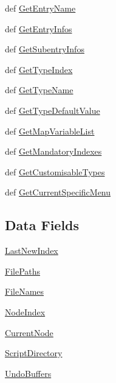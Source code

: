 \begin{CompactItemize}
def \hyperlink{classnodemanager_1_1NodeManager_4da3a475cb7e66bf86f42aa8e9915673}{Get\-Entry\-Name}
\item 
def \hyperlink{classnodemanager_1_1NodeManager_eb864b0df23c119a93ec91836f7dc131}{Get\-Entry\-Infos}
\item 
def \hyperlink{classnodemanager_1_1NodeManager_b305e31c72f62266cfc5e15b056a0e90}{Get\-Subentry\-Infos}
\item 
def \hyperlink{classnodemanager_1_1NodeManager_a6660f49630ad17289a6f8c13569aef8}{Get\-Type\-Index}
\item 
def \hyperlink{classnodemanager_1_1NodeManager_02618960ca94cf1e287758a4cd8e1891}{Get\-Type\-Name}
\item 
def \hyperlink{classnodemanager_1_1NodeManager_b8edb6dc0298dc7d117a327c06a24ab9}{Get\-Type\-Default\-Value}
\item 
def \hyperlink{classnodemanager_1_1NodeManager_7b93c95ade6272d2c7e79e0b26b3bbe3}{Get\-Map\-Variable\-List}
\item 
def \hyperlink{classnodemanager_1_1NodeManager_fa0ae7296e271effdd28a3f2fbb94778}{Get\-Mandatory\-Indexes}
\item 
def \hyperlink{classnodemanager_1_1NodeManager_38953afbd29be22621f6adab28ae3869}{Get\-Customisable\-Types}
\item 
def \hyperlink{classnodemanager_1_1NodeManager_9f8b78c75172bf420dcc8d9867b595a5}{Get\-Current\-Specific\-Menu}
\end{CompactItemize}
\subsection*{Data Fields}
\begin{CompactItemize}
\item 
\hyperlink{classnodemanager_1_1NodeManager_6f4b2b8bfaad8695971d7b3fbde3d24c}{Last\-New\-Index}
\item 
\hyperlink{classnodemanager_1_1NodeManager_41b876781b15d80c22373f32b7efa3e4}{File\-Paths}
\item 
\hyperlink{classnodemanager_1_1NodeManager_d5be2d321e10ab74d8d163580fae5007}{File\-Names}
\item 
\hyperlink{classnodemanager_1_1NodeManager_410b10ff94d011c0423028d7d57d0e4d}{Node\-Index}
\item 
\hyperlink{classnodemanager_1_1NodeManager_c63d9db3d9564ad4c110fddf4532c0ba}{Current\-Node}
\item 
\hyperlink{classnodemanager_1_1NodeManager_6c8bf71c030cd7647b28623e61c7df4a}{Script\-Directory}
\item 
\hyperlink{classnodemanager_1_1NodeManager_4e29c7a82ea6540edcbc55a1f98b77ae}{Undo\-Buffers}
\end{CompactItemize}


